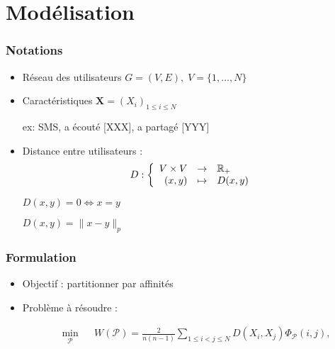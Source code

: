 \documentclass[c]{beamer}
\begin{document}
\section{Mod\'elisation}
\begin{frame}
    \frametitle{Notations}
    \begin{itemize}
        \item R\'eseau des utilisateurs $G = (V, E), \; V = \{1, \ldots, N\}$
            \vspace{.3cm}
        \item Caract\'eristiques $\mathbf{X} = \left( X_i \right)_{1 \leq i \leq N}$
            \vspace{0.15cm}

            ex: SMS, a écouté [XXX], a partagé [YYY]
            \vspace{.3cm}
        \item Distance entre utilisateurs :
            \[
                        D:\left\{
                        \begin{array}{r c l}
                            V \times V & \rightarrow & \mathbb{R}_+ \\
                            (x, y) & \mapsto & D(x, y)
                        \end{array}
                        \right.
                    \]

                    $D(x, y) = 0 \iff x = y$
                
                    $D(x, y) = \|x - y\|_p$


    \end{itemize}
\end{frame}

\begin{frame}
    \frametitle{Formulation}
    \begin{itemize}
        \item Objectif : partitionner par affinités
        \item
    Problème à r\'esoudre :

    \[
        \begin{aligned}
            & \min_{\mathcal{P}}
            && W\left(\mathcal{P} \right)
            = \frac{2}{n(n-1)} \sum_{1 \leq i < j \leq N} D(X_i, X_j) \Phi_{\mathcal{P}}(i, j),
        \end{aligned}
    \]

    \end{itemize}

\end{frame}
\end{document}
